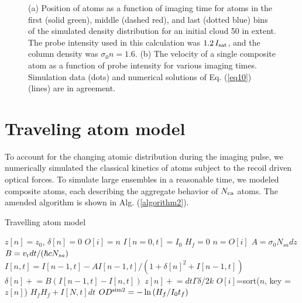 \begin{figure}
\caption{(a) Position of atoms as a function of imaging time for atoms in the first (solid green), middle (dashed red), and last (dotted blue) bins of the simulated density distribution for an initial cloud 50 \um{} in extent. The probe intensity used in this calculation was $1.2\, I_{\rm{sat}}$, and the column density was $\sigma_0 n=1.6$. (b) The velocity of a single composite atom as a function of probe intensity for various imaging times. Simulation data (dots) and numerical  solutions of Eq. (\ref{eq10}) (lines) are in agreement.}
\label{fig:simTests}
\end{figure}

\section{Traveling atom model}
To account for the changing atomic distribution during the imaging pulse, we numerically simulated the classical kinetics of atoms subject to the recoil driven optical forces. To simulate large ensembles in a reasonable time, we modeled composite atoms, each describing the aggregate behavior of $N_{\rm{ca}}$ atoms. The amended algorithm is shown in Alg. (\ref{algorithm2}).
\begin{algorithm}
\caption{Travelling atom model}
\label{algorithm2}
\begin{algorithmic}
\STATE $z[n]=z_0$, $\delta[n]=0$ 
\STATE $O[i]=n$ 
\STATE $I[n=0,t]=I_0$ 
\STATE $H_f=0$ 
\STATE $n=O[i]$ 
 \STATE $A=\sigma_0 N_{sa} dz$ 
 \STATE $B=v_{\rm{r}} dt/(\hbar c  N_{sa})$  
\STATE $I[n,t]=I[n-1,t] - A I[n-1,t]/(1+\delta[n]^2+I[n-1,t])$  
\STATE $\delta[n]\mathrel{+}=B\left(I[n-1,t]-I[n,t]\right)$  
\STATE $z[n]\mathrel{+}=dt\Gamma\delta/2k$ 
\ENDFOR
\STATE $O[i]$=sort($n$, key =$z[n]$) 
\STATE $H_f H_f+ I[N,t]dt$ 
\ENDFOR
\STATE $OD^{\rm{sim2}}=-\ln{(H_f/I_0t_f)}$
\end{algorithmic}
\end{algorithm}
